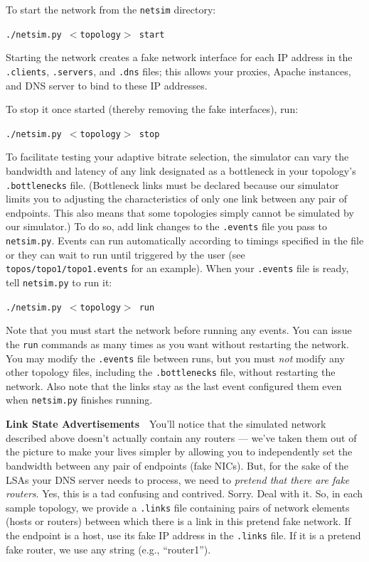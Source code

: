 \documentclass{article}
\begin{document}
To start the network from the \texttt{netsim} directory:
\begin{center}
	\texttt{./netsim.py $<$topology$>$ start}
\end{center}
Starting the network creates a fake network interface for each IP address in
the \texttt{.clients}, \texttt{.servers}, and \texttt{.dns} files; this allows
your proxies, Apache instances, and DNS server to bind to these IP addresses.

To stop it once started (thereby removing the fake interfaces), run:
\begin{center}
	\texttt{./netsim.py $<$topology$>$ stop}
\end{center}

To facilitate testing your adaptive bitrate selection, the simulator can vary
the bandwidth and latency of any link designated as a bottleneck in your
topology's \texttt{.bottlenecks} file. (Bottleneck links must be declared
because our simulator limits you to adjusting the characteristics of only one
link between any pair of endpoints. This also means that some topologies simply
cannot be simulated by our simulator.) To do so, add link changes to the
\texttt{.events} file you pass to \texttt{netsim.py}. Events can run
automatically according to timings specified in the file or they can wait to
run until triggered by the user (see \texttt{topos/topo1/topo1.events} for an
example). When your \texttt{.events} file is ready, tell \texttt{netsim.py} to
run it:
\begin{center}
	\texttt{./netsim.py $<$topology$>$ run}
\end{center}
Note that you must start the network before running any events. You can issue
the \texttt{run} commands as many times as you want without restarting the
network. You may modify the \texttt{.events} file between runs, but you must
\emph{not} modify any other topology files, including the \texttt{.bottlenecks}
file, without restarting the network. Also note that the links stay as the last
event configured them even when \texttt{netsim.py} finishes running.

\medskip \noindent \textbf{Link State Advertisements}~~You'll notice that the
simulated network described above doesn't actually contain any routers ---
we've taken them out of the picture to make your lives simpler by allowing you
to independently set the bandwidth between any pair of endpoints (fake NICs).
But, for the sake of the LSAs your DNS server needs to process, we need to
\emph{pretend that there are fake routers}. Yes, this is a tad confusing and
contrived. Sorry. Deal with it. So, in each sample topology, we provide a
\texttt{.links} file containing pairs of network elements (hosts or routers)
between which there is a link in this pretend fake network. If the endpoint is
a host, use its fake IP address in the \texttt{.links} file. If it is a pretend
fake router, we use any string (e.g., ``router1'').
\end{document}
